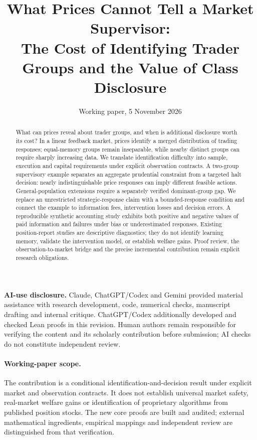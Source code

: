 \documentclass[12pt]{article}
\title{What Prices Cannot Tell a Market Supervisor:\\ The Cost of Identifying Trader Groups and the Value of Class Disclosure}
\author{}
\date{Working paper, 5 November 2026}
\theoremstyle{definition}
\theoremstyle{remark}
\begin{document}
\maketitle
\thispagestyle{empty}
\begingroup\onehalfspacing

\begin{abstract}
\noindent What can prices reveal about trader groups, and when is additional disclosure worth its cost? In a linear feedback market, prices identify a merged distribution of trading responses; equal-memory groups remain inseparable, while nearby distinct groups can require sharply increasing data. We translate identification difficulty into sample, execution and capital requirements under explicit observation contracts. A two-group supervisory example separates an aggregate prudential constraint from a targeted halt decision: nearly indistinguishable price responses can imply different feasible actions. General-population extensions require a separately verified dominant-group gap. We replace an unrestricted strategic-response claim with a bounded-response condition and connect the example to information fees, intervention losses and decision errors. A reproducible synthetic accounting study exhibits both positive and negative values of paid information and failures under bias or underestimated responses. Existing position-report studies are descriptive diagnostics; they do not identify learning memory, validate the intervention model, or establish welfare gains. Proof review, the observation-to-market bridge and the precise incremental contribution remain explicit research obligations.
\end{abstract}

\noindent\textbf{AI-use disclosure.} Claude, ChatGPT/Codex and Gemini provided material assistance with research development, code, numerical checks, manuscript drafting and internal critique. ChatGPT/Codex additionally developed and checked Lean proofs in this revision. Human authors remain responsible for verifying the content and its scholarly contribution before submission; AI checks do not constitute independent review.


\paragraph{Working-paper scope.} The contribution is a conditional identification-and-decision result under explicit market and observation contracts. It does not establish universal market safety, real-market welfare gains or identification of proprietary algorithms from published position stocks. The new core proofs are built and audited; external mathematical ingredients, empirical mappings and independent review are distinguished from that verification.
\end{document}
